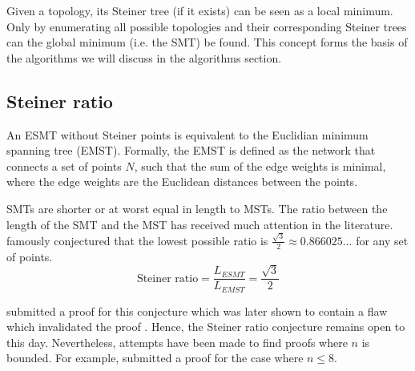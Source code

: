 \documentclass{l4proj}
\begin{document}
Given a topology, its Steiner tree (if it exists) can be seen as a local minimum. Only by enumerating all possible topologies and their corresponding Steiner trees can the global minimum (i.e. the SMT) be found. This concept forms the basis of the algorithms we will discuss in the algorithms section.

\subsection{Steiner ratio}
\label{sec:esmt_steiner_ratio}
An ESMT without Steiner points is equivalent to the Euclidian minimum spanning tree (EMST). Formally, the EMST is defined as the network that connects a set of points $N$, such that the sum of the edge weights is minimal, where the edge weights are the Euclidean distances between the points.

SMTs are shorter or at worst equal in length to MSTs. The ratio between the length of the SMT and the MST has received much attention in the literature. \cite{Gilbert1968SteinerMT} famously conjectured that the lowest possible ratio is $\frac{\sqrt{3}}{2} \approx 0.866025...$ for any set of points.
$$
    \text{Steiner ratio} = \frac{L_{ESMT}}{L_{EMST}} = \frac{\sqrt{3}}{2}
$$

\cite{Steiner_ratio_proof} submitted a proof for this conjecture which was later shown to contain a flaw which invalidated the proof \citep{Steiner_ratio_proof_invalidated}. Hence, the Steiner ratio conjecture remains open to this day.
Nevertheless, attempts have been made to find proofs where $n$ is bounded. For example, \cite{Steiner_ratio_proof_8_points} submitted a proof for the case where $n \leq 8$.
\end{document}
